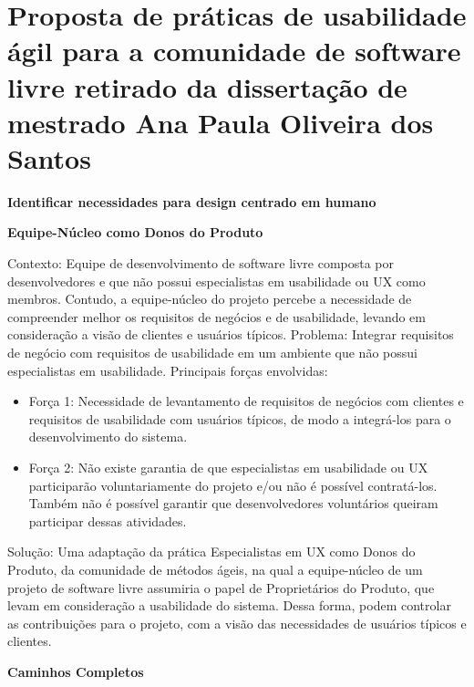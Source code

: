 \newpage
\section{Proposta de práticas de usabilidade ágil para a comunidade de software livre retirado da dissertação de mestrado Ana Paula Oliveira dos Santos}
\label{ap-praticas-usabilidade}

\textbf{Identificar necessidades para design centrado em humano}

\textbf{Equipe-Núcleo como Donos do Produto}

Contexto: Equipe de desenvolvimento de software livre composta por desenvolvedores e que não possui especialistas em usabilidade ou UX como membros. Contudo, a equipe-núcleo do projeto percebe a necessidade de compreender melhor os requisitos de negócios e de usabilidade, levando em consideração a visão de clientes e usuários típicos.
Problema: Integrar requisitos de negócio com requisitos de usabilidade em um ambiente que não possui especialistas em usabilidade. Principais forças envolvidas:
\begin{itemize}
\item Força 1: Necessidade de levantamento de requisitos de negócios com clientes e requisitos de usabilidade com usuários típicos, de modo a integrá-los para o desenvolvimento do sistema.
\item Força 2: Não existe garantia de que especialistas em usabilidade ou UX participarão voluntariamente do projeto e/ou não é possível contratá-los. Também não é possível garantir que desenvolvedores voluntários queiram participar dessas atividades.
\end{itemize}
Solução: Uma adaptação da prática Especialistas em UX como Donos do Produto, da comunidade de métodos ágeis, na qual a equipe-núcleo de um projeto de software livre assumiria o papel de Proprietários do Produto, que levam em consideração a usabilidade do sistema. Dessa forma, podem controlar as contribuições para o projeto, com a visão das necessidades de usuários típicos e clientes.

%
\textbf{Caminhos Completos}

